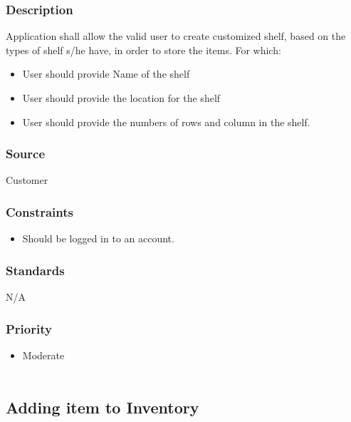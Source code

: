 \subsubsection{Description}
Application shall allow the valid user to create customized shelf, based on the types of shelf s/he have, in order to store the items. For which:
\begin{itemize}
\item User should provide Name of the shelf
\item User should provide the location for the shelf
\item User should provide the numbers of rows and column in the shelf.
\end{itemize}
\subsubsection{Source}
Customer
\subsubsection{Constraints}
\begin{itemize}
\item Should be logged in to an account.
\end{itemize}
\subsubsection{Standards}
N/A
\subsubsection{Priority}
\begin{itemize}
\item Moderate \\ \\
\end{itemize}

\subsection{Adding item to Inventory}
